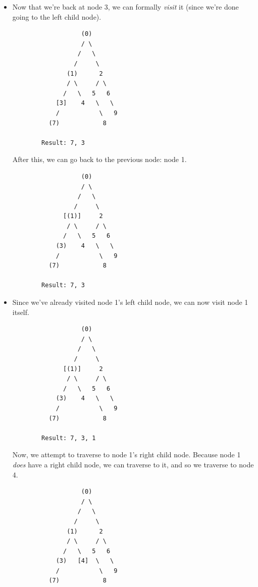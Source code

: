 \documentclass[letterpaper]{article}
\begin{document}
\begin{itemize}
\begin{verbatim}
        Result: 7 
    \end{verbatim}

    Afterwards, we attempt to traverse to the right child node. However, there is no right child node associated with node 7, so we go back to the previous node (since we're done processing node 7).
    \begin{verbatim}
                   (0)
                   / \
                  /   \
                 /     \
               (1)      2 
               / \     / \ 
              /   \   5   6
            [3]    4   \   \ 
            /           \   9
          (7)            8

        Result: 7 
    \end{verbatim}


    \item Now that we're back at node 3, we can formally \emph{visit} it (since we're done going to the left child node). 
    
    \begin{verbatim}
                   (0)
                   / \
                  /   \
                 /     \
               (1)      2 
               / \     / \ 
              /   \   5   6
            [3]    4   \   \ 
            /           \   9
          (7)            8

        Result: 7, 3 
    \end{verbatim}

    After this, we can go back to the previous node: node 1.
    \begin{verbatim}
                   (0)
                   / \
                  /   \
                 /     \
              [(1)]     2 
               / \     / \ 
              /   \   5   6
            (3)    4   \   \ 
            /           \   9
          (7)            8

        Result: 7, 3 
    \end{verbatim}

    \item Since we've already visited node 1's left child node, we can now visit node 1 itself. 
    \begin{verbatim}
                   (0)
                   / \
                  /   \
                 /     \
              [(1)]     2 
               / \     / \ 
              /   \   5   6
            (3)    4   \   \ 
            /           \   9
          (7)            8

        Result: 7, 3, 1 
    \end{verbatim}
    Now, we attempt to traverse to node 1's right child node. Because node 1 \emph{does} have a right child node, we can traverse to it, and so we traverse to node 4. 
    \begin{verbatim}
                   (0)
                   / \
                  /   \
                 /     \
               (1)      2 
               / \     / \ 
              /   \   5   6
            (3)   [4]  \   \ 
            /           \   9
          (7)            8


\end{verbatim}
\end{itemize}
\end{document}
